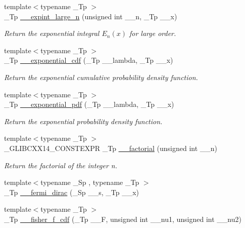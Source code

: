 \begin{DoxyCompactItemize}
{\footnotesize template$<$typename \+\_\+\+Tp $>$ }\\\+\_\+\+Tp \hyperlink{namespacestd_1_1____detail_a75b6c98f991ef9265e69c27feb554276}{\+\_\+\+\_\+expint\+\_\+large\+\_\+n} (unsigned int \+\_\+\+\_\+n, \+\_\+\+Tp \+\_\+\+\_\+x)
\begin{DoxyCompactList}\small\item\em Return the exponential integral $ E_n(x) $ for large order. \end{DoxyCompactList}\item 
{\footnotesize template$<$typename \+\_\+\+Tp $>$ }\\\+\_\+\+Tp \hyperlink{namespacestd_1_1____detail_ada7f806f891a02d7825ec9a8862302ad}{\+\_\+\+\_\+exponential\+\_\+cdf} (\+\_\+\+Tp \+\_\+\+\_\+lambda, \+\_\+\+Tp \+\_\+\+\_\+x)
\begin{DoxyCompactList}\small\item\em Return the exponential cumulative probability density function. \end{DoxyCompactList}\item 
{\footnotesize template$<$typename \+\_\+\+Tp $>$ }\\\+\_\+\+Tp \hyperlink{namespacestd_1_1____detail_add35fd0c4c00f412c0fab7b6018ce2cd}{\+\_\+\+\_\+exponential\+\_\+pdf} (\+\_\+\+Tp \+\_\+\+\_\+lambda, \+\_\+\+Tp \+\_\+\+\_\+x)
\begin{DoxyCompactList}\small\item\em Return the exponential probability density function. \end{DoxyCompactList}\item 
{\footnotesize template$<$typename \+\_\+\+Tp $>$ }\\\+\_\+\+G\+L\+I\+B\+C\+X\+X14\+\_\+\+C\+O\+N\+S\+T\+E\+X\+PR \+\_\+\+Tp \hyperlink{namespacestd_1_1____detail_a8de5d6069cbef126684be0800f47f8b2}{\+\_\+\+\_\+factorial} (unsigned int \+\_\+\+\_\+n)
\begin{DoxyCompactList}\small\item\em Return the factorial of the integer n. \end{DoxyCompactList}\item 
{\footnotesize template$<$typename \+\_\+\+Sp , typename \+\_\+\+Tp $>$ }\\\+\_\+\+Tp \hyperlink{namespacestd_1_1____detail_a470e563c4e88c433f94dca391814dc61}{\+\_\+\+\_\+fermi\+\_\+dirac} (\+\_\+\+Sp \+\_\+\+\_\+s, \+\_\+\+Tp \+\_\+\+\_\+x)
\item 
{\footnotesize template$<$typename \+\_\+\+Tp $>$ }\\\+\_\+\+Tp \hyperlink{namespacestd_1_1____detail_a3825f4b63cdd255c1ca790bf16d844a1}{\+\_\+\+\_\+fisher\+\_\+f\+\_\+cdf} (\+\_\+\+Tp \+\_\+\+\_\+F, unsigned int \+\_\+\+\_\+nu1, unsigned int \+\_\+\+\_\+nu2)

\end{DoxyCompactItemize}
